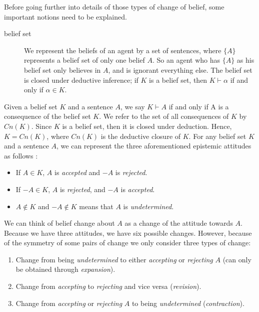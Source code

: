 Before going further into details of those types of change of belief, some important notions need to be explained.

\begin{description}
\item[belief set]

We represent the beliefs of an agent by a set of sentences, where $\{A\}$ represents a belief set of only one belief $A$. So an agent who has $\{A\}$ as his belief set only believes in $A$, and is ignorant everything else. The belief set is closed under deductive inference; if $K$ is a belief set, then $K \vdash \alpha$ if and only if $\alpha \in K$.
\end{description}

Given a belief set $K$ and a sentence $A$, we say $K \vdash A$ if and only if A is a consequence of the belief set $K$. We refer to the set of all consequences of $K$ by $Cn(K)$. Since $K$ is a belief set, then it is closed under deduction. Hence, $K = Cn(K)$, where $Cn(K)$ is the deductive closure of $K$. For any belief set $K$ and a sentence $A$, we can represent the three aforementioned epistemic attitudes as follows \cite{flux}:

\begin{itemize}
\item If $A \in K$, $A$ is \textit{accepted} and $-A$ is \textit{rejected}.

\item If $-A \in K$, $A$ is \textit{rejected}, and $-A$ is \textit{accepted}.

\item $A \notin K$ and $-A \notin K$ means that $A$ is \textit{undetermined}.
\end{itemize}

We can think of belief change about $A$ as a change of the attitude towards $A$. Because we have three attitudes, we have six possible changes. However, because of the symmetry of some pairs of change we only consider three types of change:

\begin{enumerate}
\item Change from being \textit{undetermined} to either \textit{accepting} or \textit{rejecting} $A$ (can only be obtained through \textit{expansion}).
\item Change from \textit{accepting} to \textit{rejecting} and vice versa (\textit{revision}).
\item Change from \textit{accepting} or \textit{rejecting} $A$ to being \textit{undetermined} (\textit{contraction})\cite{flux}.
\end{enumerate}

